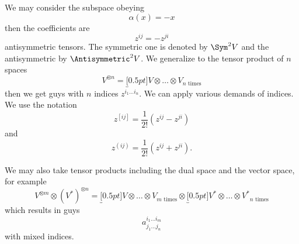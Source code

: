 We may consider the subspace obeying
\begin{equation}
\alpha(x)=-x
\end{equation}
then the coefficients are
\begin{equation}
z^{ij}=-z^{ji}
\end{equation}
antisymmetric tensors. The symmetric one is denoted by
$\Sym^{2}V$ and the antisymmetric by $\Antisymmetric^{2}V$. We
generalize to the tensor product of $n$ spaces
\begin{equation}
V^{\otimes n}=\underbracket[0.5pt]{V\otimes\dots\otimes V}_{\text{$n$ times}}
\end{equation}
then we get guys with $n$ indices $z^{i_{1}\dots i_{n}}$. We can
apply various demands of indices. We use the notation
\begin{equation}
z^{[ij]} = \frac{1}{2!}(z^{ij}-z^{ji})
\end{equation}
and
\begin{equation}
z^{(ij)} = \frac{1}{2!}(z^{ij}+z^{ji}).
\end{equation}

We may also take tensor products including the dual space and the
vector space, for example
\begin{equation}
V^{\otimes m}\otimes (V^{*})^{\otimes n} = 
\underbracket[0.5pt]{V\otimes\dots\otimes V}_{\text{$m$ times}}\otimes
\underbracket[0.5pt]{V^{*}\otimes\dots\otimes V^{*}}_{\text{$n$ times}}
\end{equation}
which results in guys
\begin{equation}
a^{i_{1}\dots i_{m}}_{j_{1}\dots j_{n}}
\end{equation}
with mixed indices.

